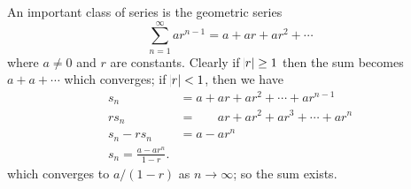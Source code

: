 An important class of series is the geometric series
\begin{displaymath}
  \sum_{n = 1}^\infty ar^{n - 1} = a + ar + ar^2 + \cdots
\end{displaymath}
where $ a \neq 0 $ and $ r $ are constants. Clearly if $ \abs{r} \geq 1 $ then the sum becomes $ a + a + \cdots $ which converges;
if $ \abs{r} < 1 $, then we have
\begin{align*}
  s_n  &= a + ar + ar^2 + \cdots + ar^{n - 1}\\
  rs_n &= \phantom{a + {}} ar + ar^2 + ar^3 + \cdots + ar^n\\
  s_n - rs_n &= a - ar^n\\
  s_n = \frac{a - ar^n}{1 - r}.
\end{align*}
which converges to $ a/(1-r) $ as $ n \to \infty $; so the sum exists.


